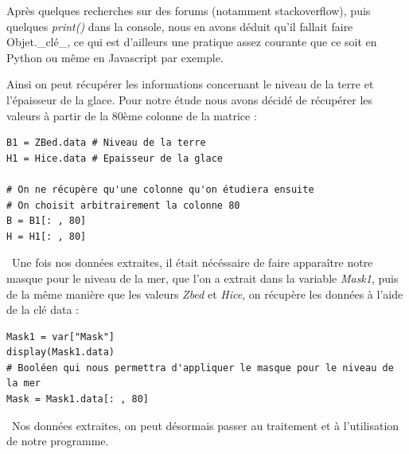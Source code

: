 \documentclass{article}
\begin{document}
Après quelques recherches sur des forums (notamment stackoverﬂow), puis quelques \textit{print()} dans la console, nous en avons déduit qu’il fallait faire Objet.\_clé\_, ce qui est d’ailleurs une pratique assez courante que ce soit en Python ou même en Javascript par exemple.

Ainsi on peut récupérer les informations concernant le niveau de la terre et l’épaisseur de la glace. Pour notre étude nous avons décidé de récupérer les valeurs à partir de la 80ème colonne de la matrice :

\begin{verbatim}
B1 = ZBed.data # Niveau de la terre
H1 = Hice.data # Epaisseur de la glace

# On ne récupère qu'une colonne qu'on étudiera ensuite 
# On choisit arbitrairement la colonne 80
B = B1[: , 80]
H = H1[: , 80]
\end{verbatim}
\
Une fois nos données extraites, il était nécéssaire de faire apparaître notre masque pour le niveau de la mer, que l’on a extrait dans la variable \textit{Mask1}, puis de la même manière que les valeurs \textit{Zbed} et \textit{Hice}, on récupère les données à l’aide de la clé data :
\begin{verbatim}
Mask1 = var["Mask"]
display(Mask1.data)
# Booléen qui nous permettra d'appliquer le masque pour le niveau de la mer
Mask = Mask1.data[: , 80]
\end{verbatim}
\
Nos données extraites, on peut désormais passer au traitement et à l’utilisation de notre programme.

\newpage
\end{document}
